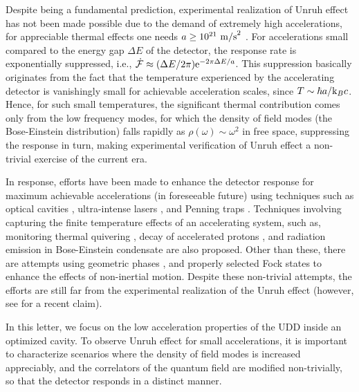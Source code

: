 \documentclass[aps,prl,nofootinbib,preprintnumbers,floatfix,twocolumn,superscriptaddress]{revtex4}
\def\e{{\rm e}}
\begin{document}
Despite being a fundamental prediction, experimental realization of Unruh effect has 
not been made possible due to the demand of extremely high accelerations, 
for appreciable thermal effects one  needs $a \geq 10^{21}~{\rm m/s}^2$
\cite{Matsas-2008}. 
For accelerations small compared to the energy gap $\Delta E$ of the detector,
the response rate is exponentially suppressed, i.e., 
${\dot {\cal F}}\approx (\Delta E/2\pi)\e^{-2\pi\Delta E/a}$. 
This suppression basically originates from the fact that the temperature 
experienced by the accelerating detector is  
vanishingly small for
achievable acceleration scales, since $T\sim \hbar a/{\rm k}_{B}c$. Hence, for such small 
temperatures, the 
significant thermal contribution comes only from the low frequency modes, for which the density 
of field modes (the Bose-Einstein distribution) falls rapidly as 
$\rho(\omega)\sim \omega^2$ in free space, suppressing the response in turn, 
making experimental verification 
of Unruh effect a non-trivial exercise of the current era. 

In response, efforts have been made to enhance the 
detector response for maximum achievable accelerations (in foreseeable future) 
using techniques such as optical cavities \cite{Scully-2003}, 
ultra-intense lasers \cite{Chen-1999, Habs-2008}, and Penning traps \cite{Rogers-1988}. 
Techniques involving capturing the finite temperature effects of an accelerating 
system, such as, monitoring thermal quivering \cite{Raval-1996}, decay of accelerated 
protons \cite{Vanzella-2001}, and radiation emission in Bose-Einstein condensate
\cite{Garay-2000,Retzker-2008} are also proposed. Other than these, 
there are attempts using geometric phases \cite{Mann-2011}, and properly selected 
Fock states \cite{Fuentes-2010} to enhance the effects of non-inertial motion. 
Despite these non-trivial attempts, the efforts are still far  from the 
experimental realization of the Unruh effect (however, see \cite{Kaminer-2021} for a recent claim).

In this letter, we focus on the low acceleration properties of the UDD 
inside an optimized cavity.
To observe Unruh effect for small accelerations, it is important to characterize 
scenarios where the density of field modes is increased appreciably, and the 
correlators of the quantum field are modified 
non-trivially, so that the detector responds in a distinct manner.
\end{document}
